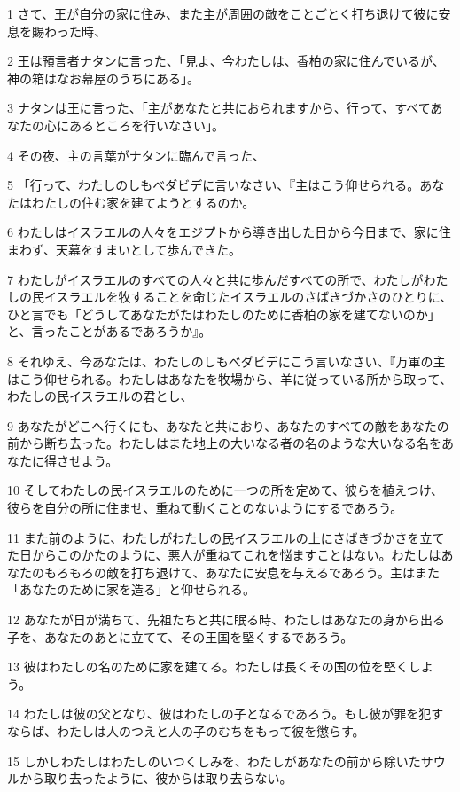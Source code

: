 \par 1 さて、王が自分の家に住み、また主が周囲の敵をことごとく打ち退けて彼に安息を賜わった時、
\par 2 王は預言者ナタンに言った、「見よ、今わたしは、香柏の家に住んでいるが、神の箱はなお幕屋のうちにある」。
\par 3 ナタンは王に言った、「主があなたと共におられますから、行って、すべてあなたの心にあるところを行いなさい」。
\par 4 その夜、主の言葉がナタンに臨んで言った、
\par 5 「行って、わたしのしもべダビデに言いなさい、『主はこう仰せられる。あなたはわたしの住む家を建てようとするのか。
\par 6 わたしはイスラエルの人々をエジプトから導き出した日から今日まで、家に住まわず、天幕をすまいとして歩んできた。
\par 7 わたしがイスラエルのすべての人々と共に歩んだすべての所で、わたしがわたしの民イスラエルを牧することを命じたイスラエルのさばきづかさのひとりに、ひと言でも「どうしてあなたがたはわたしのために香柏の家を建てないのか」と、言ったことがあるであろうか』。
\par 8 それゆえ、今あなたは、わたしのしもべダビデにこう言いなさい、『万軍の主はこう仰せられる。わたしはあなたを牧場から、羊に従っている所から取って、わたしの民イスラエルの君とし、
\par 9 あなたがどこへ行くにも、あなたと共におり、あなたのすべての敵をあなたの前から断ち去った。わたしはまた地上の大いなる者の名のような大いなる名をあなたに得させよう。
\par 10 そしてわたしの民イスラエルのために一つの所を定めて、彼らを植えつけ、彼らを自分の所に住ませ、重ねて動くことのないようにするであろう。
\par 11 また前のように、わたしがわたしの民イスラエルの上にさばきづかさを立てた日からこのかたのように、悪人が重ねてこれを悩ますことはない。わたしはあなたのもろもろの敵を打ち退けて、あなたに安息を与えるであろう。主はまた「あなたのために家を造る」と仰せられる。
\par 12 あなたが日が満ちて、先祖たちと共に眠る時、わたしはあなたの身から出る子を、あなたのあとに立てて、その王国を堅くするであろう。
\par 13 彼はわたしの名のために家を建てる。わたしは長くその国の位を堅くしよう。
\par 14 わたしは彼の父となり、彼はわたしの子となるであろう。もし彼が罪を犯すならば、わたしは人のつえと人の子のむちをもって彼を懲らす。
\par 15 しかしわたしはわたしのいつくしみを、わたしがあなたの前から除いたサウルから取り去ったように、彼からは取り去らない。

